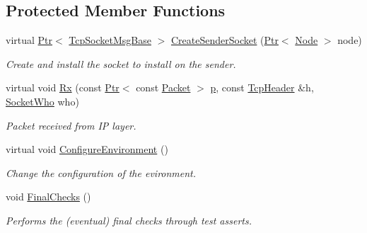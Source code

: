 \subsection*{Protected Member Functions}
\begin{DoxyCompactItemize}
\item 
virtual \hyperlink{classns3_1_1Ptr}{Ptr}$<$ \hyperlink{classns3_1_1TcpSocketMsgBase}{Tcp\+Socket\+Msg\+Base} $>$ \hyperlink{classTcpPktsAckedOpenTest_a06c50cf6667a8292419750b098eae4cb}{Create\+Sender\+Socket} (\hyperlink{classns3_1_1Ptr}{Ptr}$<$ \hyperlink{classns3_1_1Node}{Node} $>$ node)
\begin{DoxyCompactList}\small\item\em Create and install the socket to install on the sender. \end{DoxyCompactList}\item 
virtual void \hyperlink{classTcpPktsAckedOpenTest_a3dd90cf30cef24a1e65bfd7aec7e09ac}{Rx} (const \hyperlink{classns3_1_1Ptr}{Ptr}$<$ const \hyperlink{classns3_1_1Packet}{Packet} $>$ \hyperlink{lte__link__budget__x2__handover__measures_8m_ac9de518908a968428863f829398a4e62}{p}, const \hyperlink{classns3_1_1TcpHeader}{Tcp\+Header} \&h, \hyperlink{classns3_1_1TcpGeneralTest_a29338e6b7137cad650c2ff835713f6ee}{Socket\+Who} who)
\begin{DoxyCompactList}\small\item\em Packet received from IP layer. \end{DoxyCompactList}\item 
virtual void \hyperlink{classTcpPktsAckedOpenTest_a8344f777010cbb7b3c8eea3726f1b987}{Configure\+Environment} ()
\begin{DoxyCompactList}\small\item\em Change the configuration of the evironment. \end{DoxyCompactList}\item 
void \hyperlink{classTcpPktsAckedOpenTest_a50f6bcadd171cb448b352d50777bec2b}{Final\+Checks} ()
\begin{DoxyCompactList}\small\item\em Performs the (eventual) final checks through test asserts. \end{DoxyCompactList}\end{DoxyCompactItemize}
